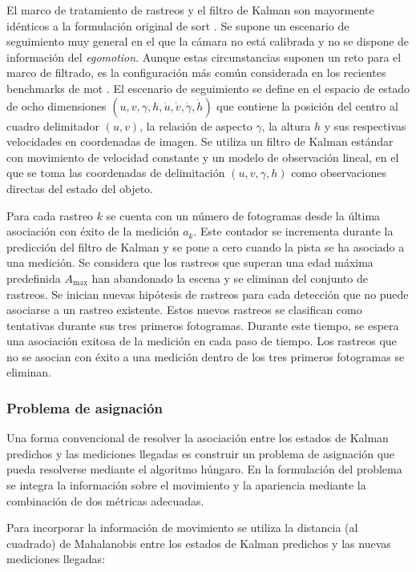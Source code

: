 El marco de tratamiento de rastreos y el filtro de Kalman son mayormente idénticos a la formulación original de \gls{sort} \cite{Bewley_2016}. Se supone un escenario de seguimiento muy general en el que la cámara no está calibrada y no se dispone de información del \textit{egomotion}. Aunque estas circunstancias suponen un reto para el marco de filtrado, es la configuración más común considerada en los recientes benchmarks de \gls{mot} \cite{milan2016mot16}. El escenario de seguimiento se define en el espacio de estado de ocho dimensiones $(u,v,\gamma,h,\dot{u},\dot{v},\dot{\gamma},\dot{h})$ que contiene la posición del centro al cuadro delimitador $(u,v)$, la relación de aspecto $\gamma$, la altura $h$ y sus respectivas velocidades en coordenadas de imagen. Se utiliza un filtro de Kalman estándar con movimiento de velocidad constante y un modelo de observación lineal, en el que se toma las coordenadas de delimitación $(u,v,\gamma,h)$ como observaciones directas del estado del objeto.

Para cada rastreo $k$ se cuenta con un número de fotogramas desde la última asociación con éxito de la medición $a_{k}$. Este contador se incrementa durante la predicción del filtro de Kalman y se pone a cero cuando la pista se ha asociado a una medición. Se considera que los rastreos que superan una edad máxima predefinida $A_{\text{max}}$ han abandonado la escena y se eliminan del conjunto de rastreos. Se inician nuevas hipótesis de rastreos para cada detección que no puede asociarse a un rastreo existente. Estos nuevos rastreos se clasifican como tentativas durante sus tres primeros fotogramas. Durante este tiempo, se espera una asociación exitosa de la medición en cada paso de tiempo. Los rastreos que no se asocian con éxito a una medición dentro de los tres primeros fotogramas se eliminan.

\subsubsection*{Problema de asignación}
\label{subsubsec:assignment-problem}

Una forma convencional de resolver la asociación entre los estados de Kalman predichos y las mediciones llegadas es construir un problema de asignación que pueda resolverse mediante el algoritmo húngaro. En la formulación del problema se integra la información sobre el movimiento y la apariencia mediante la combinación de dos métricas adecuadas.

Para incorporar la información de movimiento se utiliza la distancia (al cuadrado) de Mahalanobis entre los estados de Kalman predichos y las nuevas mediciones llegadas:

